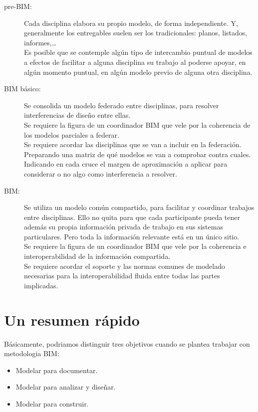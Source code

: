 \documentclass[spanish,12pt,a4paper,final,oneside]{book}
\begin{document}
\begin{description}

\item[pre-BIM:] Cada disciplina elabora su propio modelo, de forma independiente. Y, generalmente los entregables suelen ser los tradicionales: planos, listados, informes,\ldots
\\Es posible que se contemple algún tipo de intercambio puntual de modelos a efectos de facilitar a alguna disciplina su trabajo al poderse apoyar, en algún momento puntual, en algún modelo previo de alguna otra disciplina.

\item[BIM básico:] Se consolida un modelo federado entre disciplinas, para resolver interferencias de diseño entre ellas.
\\Se requiere la figura de un coordinador BIM que vele por la coherencia de los modelos parciales a federar.
\\Se requiere acordar las disciplinas que se van a incluir en la federación. Preparando una matriz de qué modelos se van a comprobar contra cuales. Indicando en cada cruce el margen de aproximación a aplicar para considerar o no algo como interferencia a resolver.

\item[BIM:] Se utiliza un modelo común compartido, para facilitar y coordinar trabajos entre disciplinas. Ello no quita para que cada participante pueda tener además su propia información privada de trabajo en sus sistemas particulares. Pero toda la información relevante está en un único sitio.
\\Se requiere la figura de un coordinador BIM que vele por la coherencia e interoperabilidad de la información compartida.
\\Se requiere acordar el soporte y las normas comunes de modelado necesarias para la interoperabilidad fluida entre todas las partes implicadas.

\end{description}

\section{Un resumen rápido}
Básicamente, podriamos distinguir tres objetivos cuando se plantea trabajar con metodologia BIM:
\begin{itemize}
\item Modelar para documentar.
\item Modelar para analizar y diseñar.
\item Modelar para construir.
\end{itemize}
\end{document}
